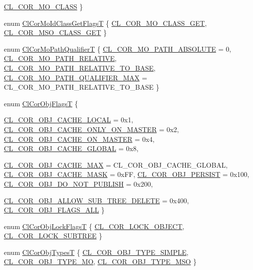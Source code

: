 \begin{CompactItemize}
\hyperlink{group__group13_gga341a11}{CL\_\-COR\_\-MO\_\-CLASS}
 \}
\item 
enum \hyperlink{group__group13_ga332}{Cl\-Cor\-Mo\-Id\-Class\-Get\-Flags\-T} \{ \hyperlink{group__group13_gga332a143}{CL\_\-COR\_\-MO\_\-CLASS\_\-GET}, 
\hyperlink{group__group13_gga332a144}{CL\_\-COR\_\-MSO\_\-CLASS\_\-GET}
 \}
\item 
enum \hyperlink{group__group13_ga337}{Cl\-Cor\-Mo\-Path\-Qualifier\-T} \{ \hyperlink{group__group13_gga337a165}{CL\_\-COR\_\-MO\_\-PATH\_\-ABSOLUTE} =  0, 
\hyperlink{group__group13_gga337a166}{CL\_\-COR\_\-MO\_\-PATH\_\-RELATIVE}, 
\hyperlink{group__group13_gga337a167}{CL\_\-COR\_\-MO\_\-PATH\_\-RELATIVE\_\-TO\_\-BASE}, 
\hyperlink{group__group13_gga337a168}{CL\_\-COR\_\-MO\_\-PATH\_\-QUALIFIER\_\-MAX} =  CL\_\-COR\_\-MO\_\-PATH\_\-RELATIVE\_\-TO\_\-BASE
 \}
\item 
enum \hyperlink{group__group13_ga335}{Cl\-Cor\-Obj\-Flags\-T} \{ \par
\hyperlink{group__group13_gga335a153}{CL\_\-COR\_\-OBJ\_\-CACHE\_\-LOCAL} =  0x1, 
\hyperlink{group__group13_gga335a154}{CL\_\-COR\_\-OBJ\_\-CACHE\_\-ONLY\_\-ON\_\-MASTER} =  0x2, 
\hyperlink{group__group13_gga335a155}{CL\_\-COR\_\-OBJ\_\-CACHE\_\-ON\_\-MASTER} =  0x4, 
\hyperlink{group__group13_gga335a156}{CL\_\-COR\_\-OBJ\_\-CACHE\_\-GLOBAL} =  0x8, 
\par
\hyperlink{group__group13_gga335a157}{CL\_\-COR\_\-OBJ\_\-CACHE\_\-MAX} =  CL\_\-COR\_\-OBJ\_\-CACHE\_\-GLOBAL, 
\hyperlink{group__group13_gga335a158}{CL\_\-COR\_\-OBJ\_\-CACHE\_\-MASK} =  0x\-FF, 
\hyperlink{group__group13_gga335a159}{CL\_\-COR\_\-OBJ\_\-PERSIST} =  0x100, 
\hyperlink{group__group13_gga335a160}{CL\_\-COR\_\-OBJ\_\-DO\_\-NOT\_\-PUBLISH} =  0x200, 
\par
\hyperlink{group__group13_gga335a161}{CL\_\-COR\_\-OBJ\_\-ALLOW\_\-SUB\_\-TREE\_\-DELETE} =  0x400, 
\hyperlink{group__group13_gga335a162}{CL\_\-COR\_\-OBJ\_\-FLAGS\_\-ALL}
 \}
\item 
enum \hyperlink{group__group13_ga330}{Cl\-Cor\-Obj\-Lock\-Flags\-T} \{ \hyperlink{group__group13_gga330a134}{CL\_\-COR\_\-LOCK\_\-OBJECT}, 
\hyperlink{group__group13_gga330a135}{CL\_\-COR\_\-LOCK\_\-SUBTREE}
 \}
\item 
enum \hyperlink{group__group13_ga329}{Cl\-Cor\-Obj\-Types\-T} \{ \hyperlink{group__group13_gga329a131}{CL\_\-COR\_\-OBJ\_\-TYPE\_\-SIMPLE}, 
\hyperlink{group__group13_gga329a132}{CL\_\-COR\_\-OBJ\_\-TYPE\_\-MO}, 
\hyperlink{group__group13_gga329a133}{CL\_\-COR\_\-OBJ\_\-TYPE\_\-MSO}
 \}
\item 

\end{CompactItemize}
